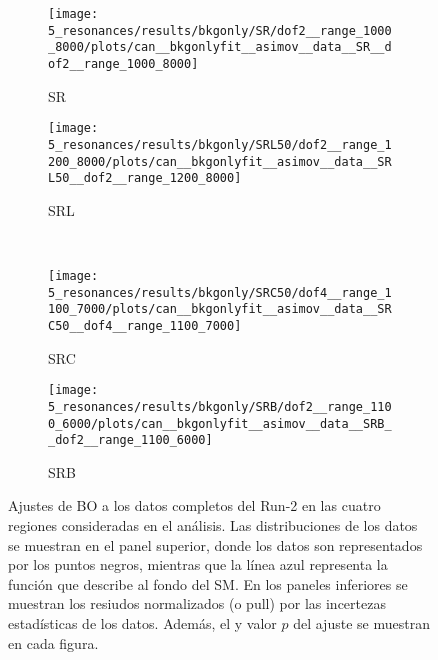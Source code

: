 \begin{figure}[ht!]
    \centering
    \begin{subfigure}[h]{0.49\linewidth}
        \centering
        \texttt{[image: 5\_resonances/results/bkgonly/SR/dof2\_\_range\_1000\_8000/plots/can\_\_bkgonlyfit\_\_asimov\_\_data\_\_SR\_\_dof2\_\_range\_1000\_8000]}
        \caption{SR}
        \label{fig:results:results:bkgonly:fits:SR}
    \end{subfigure}
    \hfill
    \begin{subfigure}[h]{0.49\linewidth}
        \centering
        \texttt{[image: 5\_resonances/results/bkgonly/SRL50/dof2\_\_range\_1200\_8000/plots/can\_\_bkgonlyfit\_\_asimov\_\_data\_\_SRL50\_\_dof2\_\_range\_1200\_8000]}
        \caption{SRL}
        \label{fig:results:results:bkgonly:fits:SRL50}
    \end{subfigure}\\
    \begin{subfigure}[h]{0.49\linewidth}
        \centering
        \texttt{[image: 5\_resonances/results/bkgonly/SRC50/dof4\_\_range\_1100\_7000/plots/can\_\_bkgonlyfit\_\_asimov\_\_data\_\_SRC50\_\_dof4\_\_range\_1100\_7000]}
        \caption{SRC}
        \label{fig:results:results:bkgonly:fits:SRC}
    \end{subfigure}
    \hfill
    \begin{subfigure}[h]{0.49\linewidth}
        \centering
        \texttt{[image: 5\_resonances/results/bkgonly/SRB/dof2\_\_range\_1100\_6000/plots/can\_\_bkgonlyfit\_\_asimov\_\_data\_\_SRB\_\_dof2\_\_range\_1100\_6000]}
        \caption{SRB}
        \label{fig:results:results:bkgonly:fits:SRB}
    \end{subfigure}
    \caption{Ajustes de \ac{BO} a los datos completos del Run-2 en las cuatro regiones consideradas en el análisis. Las distribuciones de los datos se muestran en el panel superior, donde los datos son representados por los puntos negros, mientras que la línea azul representa la función que describe al fondo del \ac{SM}. En los paneles inferiores se muestran los resiudos normalizados (o pull) por las incertezas estadísticas de los datos. Además, el \chisq y valor \(p\) del ajuste se muestran en cada figura.}
    \label{fig:results:results:bkgonly:fits}
\end{figure}

